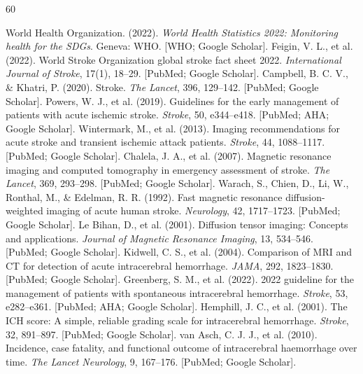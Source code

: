 \documentclass[10pt,a4paper]{article}
\begin{document}
\clearpage
{}
\fontsize{7}{7.4}\selectfont
\renewcommand{\refname}{References}
\begin{thebibliography}{60}
\setlength{\itemsep}{0pt}

 World Health Organization. (2022). \textit{World Health Statistics 2022: Monitoring health for the SDGs}. Geneva: WHO. [WHO; Google Scholar].
 Feigin, V. L., et al. (2022). World Stroke Organization global stroke fact sheet 2022. \textit{International Journal of Stroke}, 17(1), 18--29. [PubMed; Google Scholar].
 Campbell, B. C. V., \& Khatri, P. (2020). Stroke. \textit{The Lancet}, 396, 129--142. [PubMed; Google Scholar].
 Powers, W. J., et al. (2019). Guidelines for the early management of patients with acute ischemic stroke. \textit{Stroke}, 50, e344--e418. [PubMed; AHA; Google Scholar].
 Wintermark, M., et al. (2013). Imaging recommendations for acute stroke and transient ischemic attack patients. \textit{Stroke}, 44, 1088--1117. [PubMed; Google Scholar].
 Chalela, J. A., et al. (2007). Magnetic resonance imaging and computed tomography in emergency assessment of stroke. \textit{The Lancet}, 369, 293--298. [PubMed; Google Scholar].
 Warach, S., Chien, D., Li, W., Ronthal, M., \& Edelman, R. R. (1992). Fast magnetic resonance diffusion-weighted imaging of acute human stroke. \textit{Neurology}, 42, 1717--1723. [PubMed; Google Scholar].
 Le Bihan, D., et al. (2001). Diffusion tensor imaging: Concepts and applications. \textit{Journal of Magnetic Resonance Imaging}, 13, 534--546. [PubMed; Google Scholar].
 Kidwell, C. S., et al. (2004). Comparison of MRI and CT for detection of acute intracerebral hemorrhage. \textit{JAMA}, 292, 1823--1830. [PubMed; Google Scholar].
 Greenberg, S. M., et al. (2022). 2022 guideline for the management of patients with spontaneous intracerebral hemorrhage. \textit{Stroke}, 53, e282--e361. [PubMed; AHA; Google Scholar].
 Hemphill, J. C., et al. (2001). The ICH score: A simple, reliable grading scale for intracerebral hemorrhage. \textit{Stroke}, 32, 891--897. [PubMed; Google Scholar].
 van Asch, C. J. J., et al. (2010). Incidence, case fatality, and functional outcome of intracerebral haemorrhage over time. \textit{The Lancet Neurology}, 9, 167--176. [PubMed; Google Scholar].

\end{thebibliography}
\end{document}
